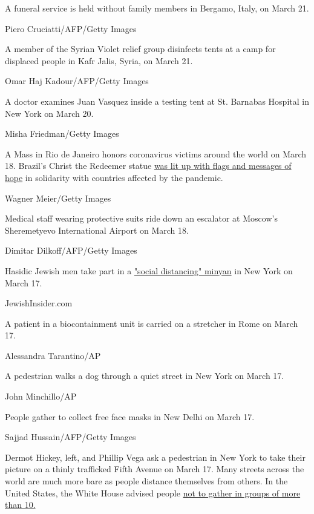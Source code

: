 A funeral service is held without family members in Bergamo, Italy, on
March 21.

Piero Cruciatti/AFP/Getty Images

A member of the Syrian Violet relief group disinfects tents at a camp
for displaced people in Kafr Jalis, Syria, on March 21.

Omar Haj Kadour/AFP/Getty Images

A doctor examines Juan Vasquez inside a testing tent at St. Barnabas
Hospital in New York on March 20.

Misha Friedman/Getty Images

A Mass in Rio de Janeiro honors coronavirus victims around the world on
March 18. Brazil's Christ the Redeemer statue
\href{https://www.cnn.com/travel/article/coronavirus-rio-christ-the-redeemer-trnd/index.html}{was
lit up with flags and messages of hope} in solidarity with countries
affected by the pandemic.

Wagner Meier/Getty Images

Medical staff wearing protective suits ride down an escalator at
Moscow's Sheremetyevo International Airport on March 18.

Dimitar Dilkoff/AFP/Getty Images

Hasidic Jewish men take part in a
\href{https://jewishinsider.com/2020/03/white-houses-avi-berkowitz-implores-hasidic-leaders-to-follow-coronavirus-measures/}{"social
distancing" minyan} in New York on March 17.

JewishInsider.com

A patient in a biocontainment unit is carried on a stretcher in Rome on
March 17.

Alessandra Tarantino/AP

A pedestrian walks a dog through a quiet street in New York on March 17.

John Minchillo/AP

People gather to collect free face masks in New Delhi on March 17.

Sajjad Hussain/AFP/Getty Images

Dermot Hickey, left, and Phillip Vega ask a pedestrian in New York to
take their picture on a thinly trafficked Fifth Avenue on March 17. Many
streets across the world are much more bare as people distance
themselves from others. In the United States, the White House advised
people
\href{https://www.cnn.com/2020/03/16/politics/white-house-guidelines-coronavirus/index.html}{not
to gather in groups of more than 10.}

